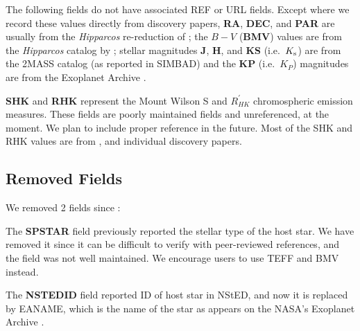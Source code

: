 \documentclass[11pt,preprint]{aastex}
\begin{document}
\begin{CJK*}{UTF8}{gbsn}
The following fields do not have associated REF or URL fields. Except
where we record these values directly from discovery papers, {\bf RA},
{\bf DEC}, and {\bf PAR} are usually from the \textit{Hipparcos}
re-reduction of \cite{van Leeuwen2009}; the $B-V$ ({\bf BMV}) values
are from the \textit{Hipparcos} catalog by \cite{Perryman1997};
stellar magnitudes {\bf J}, {\bf H}, and {\bf KS} (i.e.\ $K_{\rm s}$)
are from the 2MASS catalog
\citep{Skrutskie2006} (as reported in SIMBAD) and the {\bf KP} (i.e.\ $K_P$) magnitudes are from the Exoplanet
Archive \citep{Akeson2013}.

{\bf SHK} and {\bf RHK} represent the Mount Wilson S and
$R^\prime_{HK}$ chromospheric
emission measures.  These fields are poorly maintained fields and
unreferenced, at the moment. We plan to include proper reference in
the future. Most of the SHK and RHK values are from \cite{Butler2006},
and individual discovery papers. 

\subsection{Removed Fields}\label{sec:removed}

We removed 2 fields since \cite{Wright2011}:

The {\bf SPSTAR} field previously reported the stellar type of the host
star.  We have removed it since it can be difficult to verify with
peer-reviewed references, and the field was not well maintained.  We encourage users
to use TEFF and BMV instead.

The {\bf NSTEDID} field reported ID of host star in NStED, and now it is
replaced by EANAME, which is the name of the star as appears on the
NASA's Exoplanet Archive \citep{Akeson2013}. 



\end{CJK*}
\end{document}
